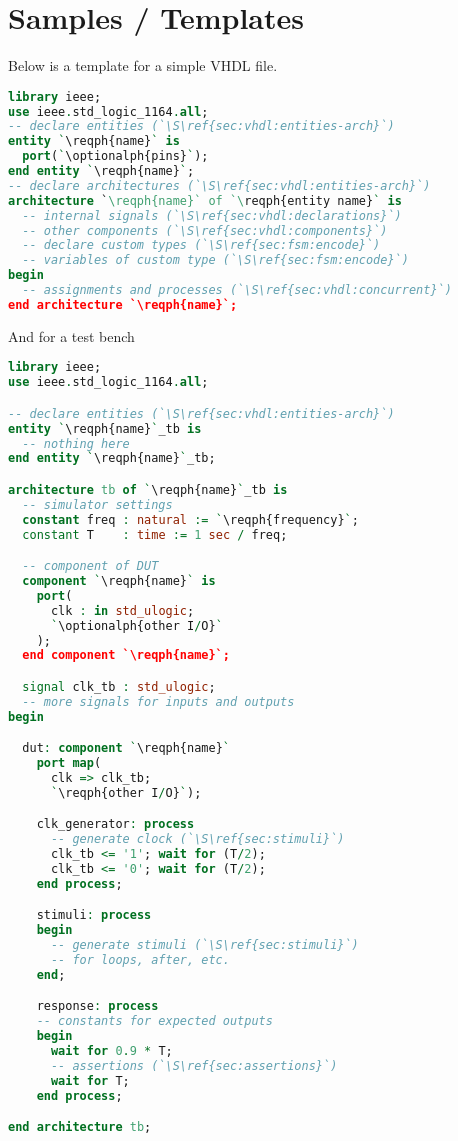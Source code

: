 \section{Samples / Templates}

Below is a template for a simple VHDL file.

\begin{lstlisting}[language=vhdl]
library ieee;
use ieee.std_logic_1164.all;
-- declare entities (`\S\ref{sec:vhdl:entities-arch}`)
entity `\reqph{name}` is
  port(`\optionalph{pins}`);
end entity `\reqph{name}`;
-- declare architectures (`\S\ref{sec:vhdl:entities-arch}`)
architecture `\reqph{name}` of `\reqph{entity name}` is
  -- internal signals (`\S\ref{sec:vhdl:declarations}`)
  -- other components (`\S\ref{sec:vhdl:components}`)
  -- declare custom types (`\S\ref{sec:fsm:encode}`)
  -- variables of custom type (`\S\ref{sec:fsm:encode}`)
begin
  -- assignments and processes (`\S\ref{sec:vhdl:concurrent}`)
end architecture `\reqph{name}`;
\end{lstlisting}
And for a test bench
\begin{lstlisting}[language=vhdl]
library ieee;
use ieee.std_logic_1164.all;

-- declare entities (`\S\ref{sec:vhdl:entities-arch}`)
entity `\reqph{name}`_tb is
  -- nothing here
end entity `\reqph{name}`_tb;

architecture tb of `\reqph{name}`_tb is
  -- simulator settings
  constant freq : natural := `\reqph{frequency}`;
  constant T    : time := 1 sec / freq;

  -- component of DUT
  component `\reqph{name}` is
    port(
      clk : in std_ulogic;
      `\optionalph{other I/O}`
    );
  end component `\reqph{name}`;

  signal clk_tb : std_ulogic;
  -- more signals for inputs and outputs
begin

  dut: component `\reqph{name}`
    port map(
      clk => clk_tb;
      `\reqph{other I/O}`);

    clk_generator: process
      -- generate clock (`\S\ref{sec:stimuli}`)
      clk_tb <= '1'; wait for (T/2);
      clk_tb <= '0'; wait for (T/2);
    end process;

    stimuli: process
    begin
      -- generate stimuli (`\S\ref{sec:stimuli}`)
      -- for loops, after, etc.
    end;

    response: process
    -- constants for expected outputs
    begin
      wait for 0.9 * T;
      -- assertions (`\S\ref{sec:assertions}`)
      wait for T;
    end process;

end architecture tb;

\end{lstlisting}
